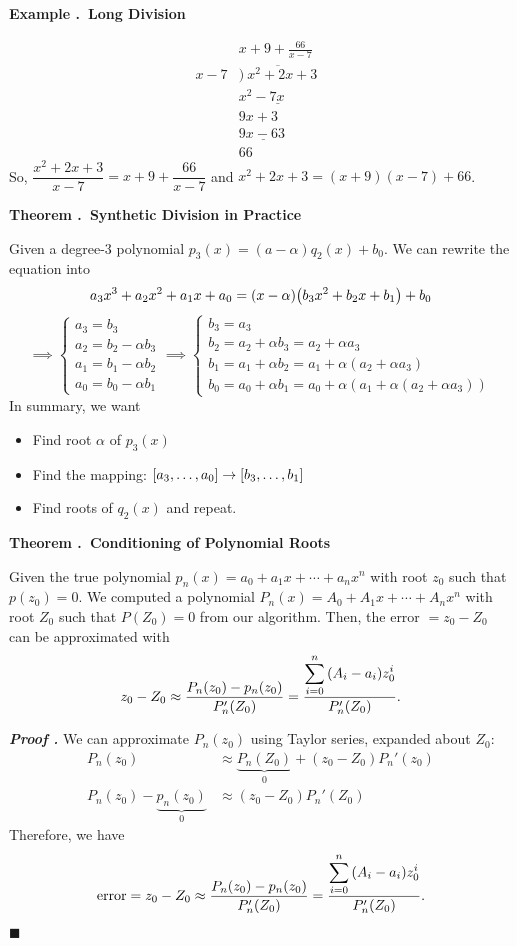 \documentclass[12pt, a4paper]{article}
\newcounter{index}[subsection]
\newenvironment*{eg}[1]{\begin{framed}\par\noindent\textbf{Example \thesubsection.\stepcounter{index}\theindex\ #1} \par}{\par\end{framed}}
\newenvironment*{thm}[1]{\begin{tcolorbox}\par\noindent\textbf{Theorem \thesubsection.\stepcounter{index}\theindex\ #1} \par}{\par\end{tcolorbox}}
\newcounter{nprf}[subsection]
\newenvironment*{prf}{\par\indent\textbf{\textit{Proof \stepcounter{nprf}\thenprf.}}}{\hfill$\blacksquare$\par}
\def\dsst{\displaystyle}
\begin{document}
\begin{eg}{Long Division}
	\[\begin{array}{lr} 
		& x+9+\frac{66}{x-7}\ \ \ \\ 
		x-7 & \overline{)\ x^2+2x+3} \ \ \ \\ 
		& \underline{x^2-7x\quad\ \ \ \ \ \ } \\ 
		& 9x+3\ \ \ \\
		& \underline{9x-63\ }\\ 
		&66\ 
	\end{array}\]	
	So, $\dfrac{x^2+2x+3}{x-7}=x+9+\dfrac{66}{x-7}$ and $x^2+2x+3=(x+9)(x-7)+66$. 
\end{eg}
\begin{thm}{Synthetic Division in Practice}
	Given a degree-$3$ polynomial $p_3(x)=(a-\alpha)q_2(x)+b_0$. We can rewrite the equation into \[a_3x^3+a_2x^2+a_1x+a_0=(x-\alpha)\qty(b_3x^2+b_2x+b_1)+b_0\]\[\implies\begin{cases}a_3=b_3\\a_2=b_2-\alpha b_3\\a_1=b_1-\alpha b_2\\a_0=b_0-\alpha b_1\end{cases}\implies\begin{cases}b_3=a_3\\b_2=a_2+\alpha b_3=a_2+\alpha a_3\\b_1=a_1+\alpha b_2=a_1+\alpha(a_2+\alpha a_3)\\b_0=a_0+\alpha b_1=a_0+\alpha(a_1+\alpha(a_2+\alpha a_3))\end{cases}\] In summary, we want 
	\begin{itemize}
		\item Find root $\alpha$ of $p_3(x)$
		\item Find the mapping: $\qty[a_3,\dots,a_0]\to\qty[b_3,\dots,b_1]$
		\item Find roots of $q_2(x)$ and repeat. 
	\end{itemize}
\end{thm}
\begin{thm}{Conditioning of Polynomial Roots}
	Given the true polynomial $p_n(x)=a_0+a_1x+\cdots+a_nx^n$ with root $z_0$ such that $p(z_0)=0$. We computed a polynomial $P_n(x)=A_0+A_1x+\cdots+A_nx^n$ with root $Z_0$ such that $P(Z_0)=0$ from our algorithm. Then, the error $=z_0-Z_0$ can be approximated with \[z_0-Z_0\approx\dfrac{P_n(z_0)-p_n(z_0)}{P'_n(Z_0)}=\dfrac{\dsst\sum_{i=0}^n\qty(A_i-a_i)z_0^i}{P_n'(Z_0)}.\]	
\end{thm}
\begin{prf}
	We can	approximate $P_n(z_0)$ using Taylor series, expanded about $Z_0$: \begin{align*}P_n(z_0)&\approx\underbrace{P_n(Z_0)}_0+(z_0-Z_0)P_n'(z_0)\\P_n(z_0)-\underbrace{p_n(z_0)}_0&\approx(z_0-Z_0)P_n'(Z_0)\end{align*} Therefore, we have \[\text{error}=z_0-Z_0\approx\dfrac{P_n(z_0)-p_n(z_0)}{P'_n(Z_0)}=\dfrac{\dsst\sum_{i=0}^n\qty(A_i-a_i)z_0^i}{P_n'(Z_0)}.\]	
\end{prf}
\end{document}
